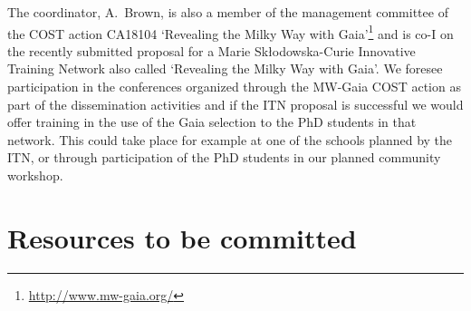 The coordinator, A.~Brown, is also a member of the management committee of the COST action CA18104 `Revealing the Milky Way with Gaia'\footnote{\url{http://www.mw-gaia.org/}} and is co-I on the recently submitted proposal for a Marie Sk\l{}odowska-Curie Innovative Training Network also called `Revealing the Milky Way with Gaia'. We foresee participation in the conferences organized through the MW-Gaia COST action as part of the dissemination activities and if the ITN proposal is successful we would offer training in the use of the Gaia selection to the PhD students in that network. This could take place for example at one of the schools planned by the ITN, or through participation of the PhD students in our planned community workshop.  

\section{Resources to be committed}
\label{sec:resources}

\makesummaryofefforttable


\makecoststable

